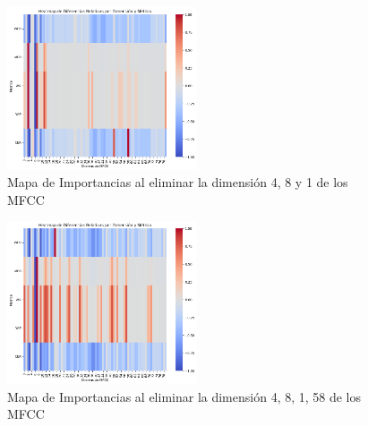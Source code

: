 \documentclass[conference]{IEEEtran}
\begin{document}
\begin{figure}[ht]
\centering
\includegraphics[width=0.5\textwidth]{images/importance_plot_no_dims_4-8-1.png}
\caption{Mapa de Importancias al eliminar la dimensión 4, 8 y 1 de los MFCC}
\end{figure}

\begin{figure}[ht]
\centering
\includegraphics[width=0.5\textwidth]{images/importance_plot_no_dims_4-8-1-58.png}
\caption{Mapa de Importancias al eliminar la dimensión 4, 8, 1, 58 de los MFCC}
\end{figure}
\end{document}

